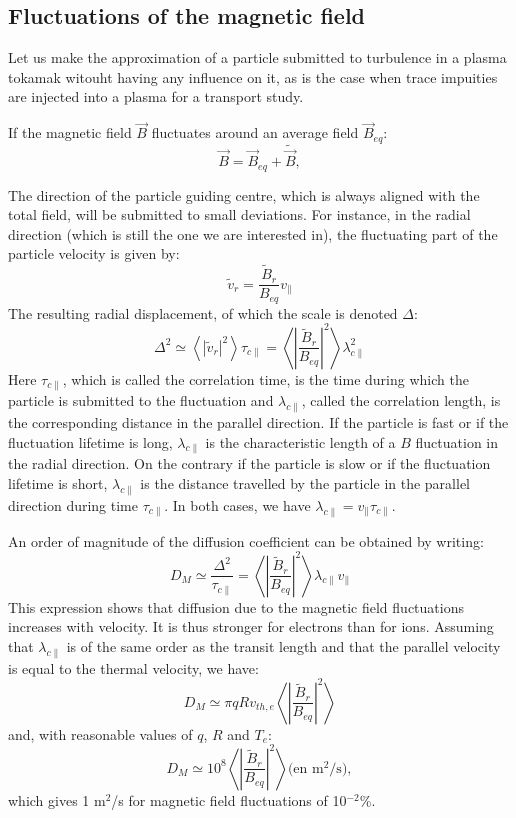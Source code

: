 				\subsection{Fluctuations of the magnetic field}
				\label{FluctuationsDuChampMagnetique}

Let us make the approximation of a particle submitted to turbulence in a plasma tokamak witouht having any influence on it, as is the case when trace impuities are injected into a plasma for a transport study.

If the magnetic field $\vec{B}$  fluctuates around an average field $\vec{B}_{eq}$:
\[
		\vec{B} = \vec{B}_{eq} + \tilde{\vec{B}},
\]

The direction of the particle guiding centre, which is always aligned with the total field, will be submitted to small deviations. For instance, in the radial direction (which is still the one we are interested in), the fluctuating part of the particle velocity is given by:
\[
		\tilde{v}_r = \frac{\tilde{B}_r}{B_{eq}}v_\|
\]
The resulting radial displacement, of which the scale is denoted $\Delta$:
\[
		\Delta^2 \simeq \left< |\tilde{v}_r|^2\!\right>\tau_{c\|} = \left< \left| \frac{\tilde{B}_r}{B_{eq}} \right|^2\right> \lambda_{c\|}^2
\]
Here $\tau_{c\|}$, which is called the correlation time, is the time during which the particle is submitted to the fluctuation and $\lambda_{c\|}$, called the correlation length, is the corresponding distance in the parallel direction. If the particle is fast or if the fluctuation lifetime is long, $\lambda_{c\|}$ is the characteristic length of a $B$ fluctuation in the radial direction. On the contrary if the particle is slow or if the fluctuation lifetime is short, $\lambda_{c\|}$  is the distance travelled by the particle in the parallel direction during time $\tau_{c\|}$. In both cases, we have $\lambda_{c\|} = v_\|\tau_{c\|}$. 

An order of magnitude of the diffusion coefficient can be obtained by writing:
\[
		D_M \simeq \frac{\Delta^2}{\tau_{c\|}} = \left< \left| \frac{\tilde{B}_r}{B_{eq}} \right|^2\right> \lambda_{c\|} v_\|
\] 
This expression shows that diffusion due to the magnetic field fluctuations increases with velocity. It is thus stronger for electrons than for ions. Assuming that $\lambda_{c\|}$ is of the same order as the transit length and that the parallel velocity is equal to the thermal velocity, we have:
\[
		D_M \simeq \pi q R v_{th,e} \left< \left| \frac{\tilde{B}_r}{B_{eq}} \right|^2\right>
\]
and, with reasonable values of $q$, $R$ and $T_e$:
\[
		D_M \simeq 10^8 \left< \left| \frac{\tilde{B}_r}{B_{eq}} \right|^2\right>		\mbox{(en m$^2$/s)},
\]
which gives 1 m$^2$/s for magnetic field fluctuations of 10$^{-2}$\%.
		
